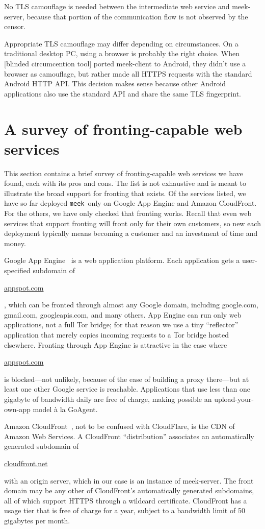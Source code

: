 \documentclass[conference]{IEEEtran}
\newcommand{\meekclient}{\mbox{meek-client}\xspace}
\newcommand{\meekserver}{\mbox{meek-server}\xspace}
\newcommand{\meek}{\texttt{meek}\xspace}
\def\urll#1{\begin{NoHyper}\url{#1}\end{NoHyper}}
\begin{document}
No TLS camouflage is needed between the intermediate web service and \meekserver,
because that portion of the communication flow is not observed by the censor.

Appropriate TLS camouflage may differ depending on circumstances.
On a traditional desktop PC, using a browser is probably the right choice.
When
[blinded circumcention tool]
ported \meekclient to Android,
they didn't use a browser as camouflage,
but rather made all HTTPS requests with the standard Android HTTP API.
This decision makes sense because other Android applications
also use the standard API and share the same TLS fingerprint.

\section{A survey of fronting-capable web services}
\label{sec:survey}

This section contains a brief survey of fronting-capable
web services we have found, each with its pros and cons.
The list is not exhaustive and is meant to illustrate the broad
support for fronting that exists.
Of the services listed, we have so far deployed \meek\
only on Google App Engine and Amazon CloudFront.
For the others, we have only checked that fronting works.
Recall that even web services that support fronting
will front only for their own customers,
so new each deployment typically means becoming a customer and an investment of time and money.

Google App Engine~\cite{googleappengine}
is a web application platform.
Each application gets a user-specified subdomain of \urll{appspot.com},
which can be fronted through almost any Google domain,
including google.com, gmail.com, googleapis.com, and many others.
App Engine can run only web applications,
not a full Tor bridge;
for that reason we use a tiny ``reflector'' application
that merely copies incoming requests to a Tor bridge hosted elsewhere.
Fronting through App Engine is attractive in the case where
\urll{appspot.com} is blocked---not unlikely,
because of the ease of building a proxy there---but
at least one other Google service is reachable.
Applications that use less than one gigabyte of bandwidth daily
are free of charge,
making possible an upload-your-own-app model
à la GoAgent.

Amazon CloudFront~\cite{cloudfront},
not to be confused with CloudFlare,
is the CDN of Amazon Web Services.
A CloudFront ``distribution'' associates
an automatically generated subdomain of \urll{cloudfront.net}
with an origin server,
which in our case is an instance of \meekserver.
The front domain may be any other of CloudFront's automatically generated subdomains, all
of which support HTTPS through a wildcard certificate.
CloudFront has a usage tier that is free of charge for a year,
subject to a bandwidth limit of 50 gigabytes per month.
\end{document}
